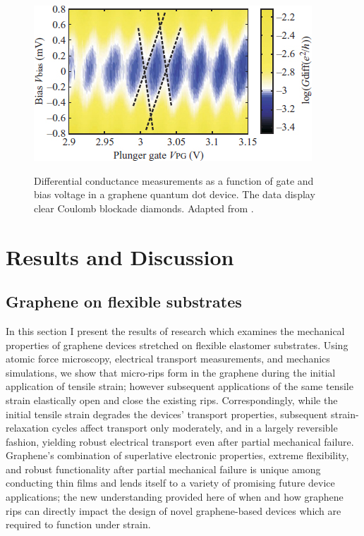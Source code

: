 \documentclass[edeposit,fullpage,draftthesis]{uiucthesis2009}
\begin{document}
            \begin{figure}
                \centering
                \includegraphics[width=0.5\linewidth]{images/experimentaltechniques/cb_diamond.jpg}\\
                \caption[Coulomb blockade diamonds in graphene]{
                    Differential conductance measurements as a function of gate and bias voltage in a 
                    graphene quantum dot device. The data display clear Coulomb blockade diamonds.
                    Adapted from \cite{guttinger2008coulomb}.
                    }
                \label{fig:cb_diamond}
            \end{figure}
            
            
    
\chapter{Results and Discussion}

\section{Graphene on flexible substrates}

    In this section I present the results of research which examines
    the mechanical properties of graphene devices stretched on flexible
    elastomer substrates. Using atomic force microscopy, electrical transport
    measurements, and mechanics simulations, we show that micro-rips form in the
    graphene during the initial application of tensile strain; however subsequent
    applications of the same tensile strain elastically open and close the existing
    rips. Correspondingly, while the initial tensile strain degrades the devices'
    transport properties, subsequent strain-relaxation cycles affect transport only
    moderately, and in a largely reversible fashion, yielding robust electrical
    transport even after partial mechanical failure. Graphene's combination of
    superlative electronic properties, extreme flexibility, and robust
    functionality after partial mechanical failure is unique among conducting thin
    films and lends itself to a variety of promising future device applications;
    the new understanding provided here of when and how graphene rips can directly
    impact the design of novel graphene-based devices which are required to
    function under strain.
    
\end{document}
